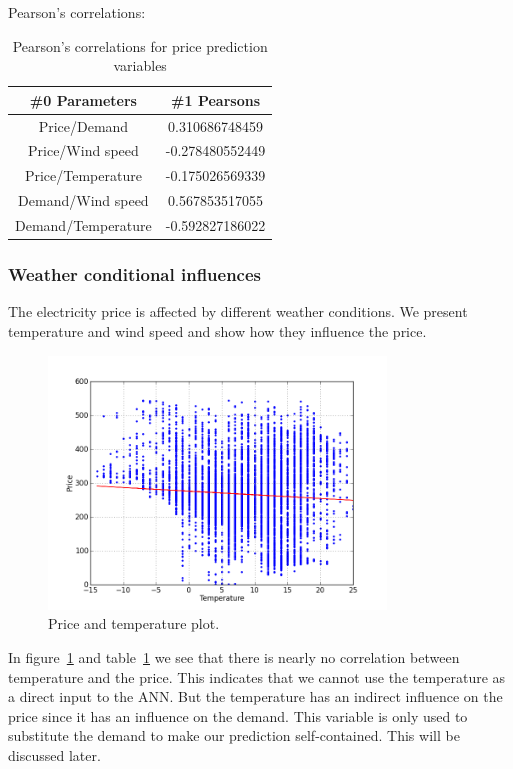 Pearson's correlations:
\begin{table}[H]
\centering  %
\begin{tabular}{c c} %
 \#0 Parameters & \#1 Pearsons \\ [0.5ex] %
\hline                  %
Price/Demand & 0.310686748459 \\
Price/Wind speed & -0.278480552449  \\
Price/Temperature & -0.175026569339 \\
Demand/Wind speed & 0.567853517055 \\
Demand/Temperature & -0.592827186022 \\
\hline %
\end{tabular}
\caption{Pearson's correlations for price prediction variables} %
\label{table:pearsonsPriceVariables} %
\end{table}

\subsubsection{Weather conditional influences}
The electricity price is affected by different weather conditions. We present temperature and wind speed and show how they influence the price.

\begin{figure}[H]
\centering
\includegraphics[width=0.8\textwidth ]{billeder/energy_price_plots/price_temp.png}
\caption{Price and temperature plot.}
\label{fig:price_temp}
\end{figure}

In figure~\ref{fig:price_temp} and table~\ref{table:pearsonsPriceVariables} we see that there is nearly no correlation between temperature and the price. This indicates that we cannot use the temperature as a direct input to the ANN. But the temperature has an indirect influence on the price since it has an influence on the demand. This variable is only used to substitute the demand to make our prediction self-contained. This will be discussed later.

